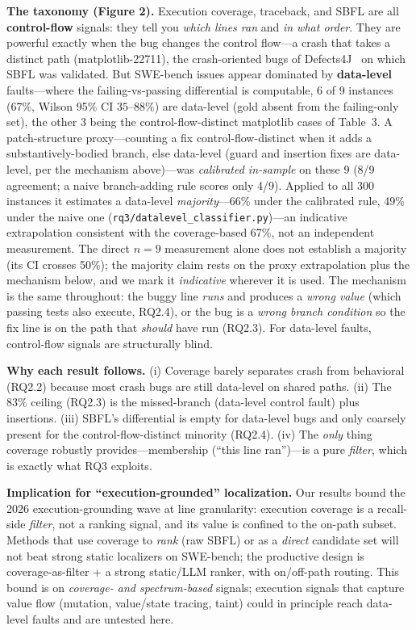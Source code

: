 \documentclass[11pt]{article}
\newcommand{\code}[1]{\texttt{#1}}
\begin{document}
\smallskip\noindent\textbf{The taxonomy (Figure 2).} Execution coverage, traceback, and SBFL are all \textbf{control-flow} signals: they tell you \emph{which lines ran} and \emph{in what order}. They are powerful exactly when the bug changes the control flow---a crash that takes a distinct path (matplotlib-22711), the crash-oriented bugs of Defects4J~\citep{defects4j} on which SBFL was validated. But SWE-bench issues appear dominated by \textbf{data-level} faults---where the failing-vs-passing differential is computable, 6 of 9 instances (67\%, Wilson 95\% CI $35$--$88\%$) are data-level (gold absent from the failing-only set), the other 3 being the control-flow-distinct matplotlib cases of Table~3. A patch-structure proxy---counting a fix control-flow-distinct when it adds a substantively-bodied branch, else data-level (guard and insertion fixes are data-level, per the mechanism above)---was \emph{calibrated in-sample} on these 9 (8/9 agreement; a naive branch-adding rule scores only 4/9). Applied to all 300 instances it estimates a data-level \emph{majority}---66\% under the calibrated rule, 49\% under the naive one (\code{rq3/datalevel\_classifier.py})---an indicative extrapolation consistent with the coverage-based 67\%, not an independent measurement. The direct $n{=}9$ measurement alone does not establish a majority (its CI crosses 50\%); the majority claim rests on the proxy extrapolation plus the mechanism below, and we mark it \emph{indicative} wherever it is used. The mechanism is the same throughout: the buggy line \emph{runs} and produces a \emph{wrong value} (which passing tests also execute, RQ2.4), or the bug is a \emph{wrong branch condition} so the fix line is on the path that \emph{should} have run (RQ2.3). For data-level faults, control-flow signals are structurally blind.

\smallskip\noindent\textbf{Why each result follows.} (i) Coverage barely separates crash from behavioral (RQ2.2) because most crash bugs are still data-level on shared paths. (ii) The 83\% ceiling (RQ2.3) is the missed-branch (data-level control fault) plus insertions. (iii) SBFL's differential is empty for data-level bugs and only coarsely present for the control-flow-distinct minority (RQ2.4). (iv) The \emph{only} thing coverage robustly provides---membership (``this line ran'')---is a pure \emph{filter}, which is exactly what RQ3 exploits.

\smallskip\noindent\textbf{Implication for ``execution-grounded'' localization.} Our results bound the 2026 execution-grounding wave at line granularity: execution coverage is a recall-side \emph{filter}, not a ranking signal, and its value is confined to the on-path subset. Methods that use coverage to \emph{rank} (raw SBFL) or as a \emph{direct} candidate set will not beat strong static localizers on SWE-bench; the productive design is coverage-as-filter + a strong static/LLM ranker, with on/off-path routing. This bound is on \emph{coverage- and spectrum-based} signals; execution signals that capture value flow (mutation, value/state tracing, taint) could in principle reach data-level faults and are untested here.
\end{document}
